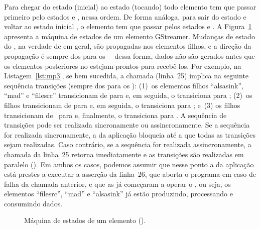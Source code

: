 \documentclass{SBCbookchapter}
\begin{document}
Para chegar do estado  (inicial) ao estado  (tocando)
todo elemento tem que passar primeiro pelo estados  e ,
nessa ordem.  De forma análoga, para sair do estado  e voltar ao
estado inicial , o elemento tem que passar pelos estados
 e .  A Figura~\ref{fig:estados-elt} apresenta a
máquina de estados de um elemento GStreamer.  Mudanças de estado do
, na verdade de  em geral, são propagadas nos
elementos filhos, e a direção da propagação é sempre dos  para os
---dessa forma, dados não são gerados antes que os elementos
posteriores no  estejam prontos para recebê-los.  Por exemplo,
na Listagem~\ref{lst:mp3}, se bem sucedida, a chamada
 (linha~25) implica na seguinte sequência
transições (sempre dos  para os ): (1)~os elementos
filhos ``alsasink'', ``mad'' e ``filesrc'' transicionam de  para
 e, em seguida, o  transiciona para ;
(2)~os filhos transicionam de  para  e, em seguida, o
 transiciona para ; e~(3) os filhos transicionam
de~ para  e, finalmente, o  transiciona
para .  A sequência de transições pode ser realizada
sincronamente ou assincronamente.  Se a sequência for realizada
sincronamente, a  da aplicação bloqueia até a que todas as
transições sejam realizadas.  Caso contrário, se a sequência for realizada
assincronamente, a chamada da linha~25 retorna imediatamente e as transições
são realizadas em paralelo ().  Em ambos os casos, podemos
assumir que nesse ponto a  da aplicação está prestes a executar a
asserção da linha~26, que aborta o programa em caso de falha da chamada
anterior, e que as  já começaram a operar o
, ou seja, os elementos ``filesrc'', ``mad'' e ``alsasink'' já
estão produzindo, processando e consumindo dados.

\begin{figure}[h]
  \centering
  \caption{Máquina de estados de um elemento ().}
  \label{fig:estados-elt}
\end{figure}
\end{document}

